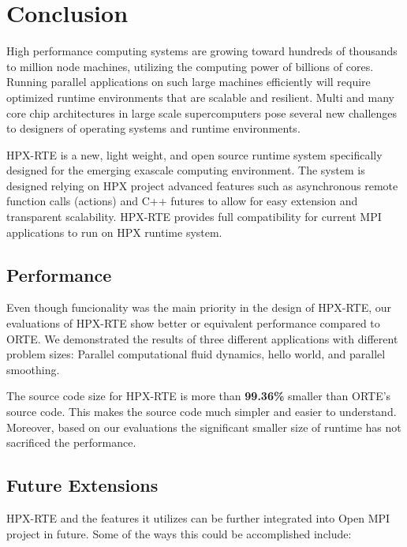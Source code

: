 \chapter{Conclusion}
\label{sec:Conclusion}

High performance computing systems are growing toward hundreds of thousands to million node machines, utilizing the computing power of billions of cores. Running parallel applications on such large machines efficiently will require optimized runtime environments that are scalable and resilient. Multi and many core chip architectures in large scale supercomputers pose several new challenges to designers of operating systems and runtime environments.

HPX-RTE is a new, light weight, and open source runtime system specifically designed for the emerging exascale computing environment. The system is designed relying on HPX project advanced features such as asynchronous remote function calls (actions) and C++ futures to allow for easy extension and transparent scalability. HPX-RTE provides full compatibility for current MPI applications to run on HPX runtime system. 

\section{Performance}
Even though funcionality was the main priority in the design of HPX-RTE, our evaluations of HPX-RTE show better or equivalent performance compared to ORTE. We demonstrated the results of three different applications with different problem sizes: Parallel computational fluid dynamics, hello world, and parallel smoothing.

The source code size for HPX-RTE is more than \textbf{99.36\%} smaller than ORTE's source code. This makes the source code much simpler and easier to understand. Moreover, based on our evaluations the significant smaller size of runtime has not sacrificed the performance.

\section{Future Extensions}
HPX-RTE and the features it utilizes can be further integrated into Open MPI project in future. Some of the ways this could be accomplished include:

